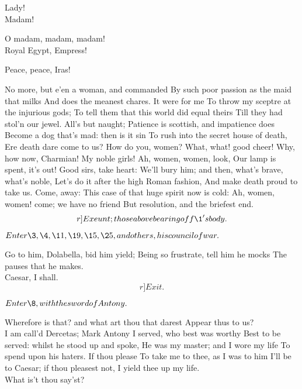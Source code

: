 \documentclass{book}
\begin{document}
\7	Lady! \\

	Madam!

\7	O madam, madam, madam! \\

	Royal Egypt,
        Empress!

\7	Peace, peace, Iras!

\2	No more, but e'en a woman, and commanded
	By such poor passion as the maid that milks
	And does the meanest chares. It were for me
	To throw my sceptre at the injurious gods;
	To tell them that this world did equal theirs
	Till they had stol'n our jewel. All's but naught;
	Patience is scottish, and impatience does
	Become a dog that's mad: then is it sin
	To rush into the secret house of death,
	Ere death dare come to us? How do you, women?
	What, what! good cheer! Why, how now, Charmian!
	My noble girls! Ah, women, women, look,
	Our lamp is spent, it's out! Good sirs, take heart:
	We'll bury him; and then, what's brave, what's noble,
	Let's do it after the high Roman fashion,
	And make death proud to take us. Come, away:
	This case of that huge spirit now is cold:
	Ah, women, women! come; we have no friend
	But resolution, and the briefest end.
	\[r]Exeunt; those above bearing off \1's body.\]

\Act





	\(Enter \3, \4, \11, \19, \15,\\ \25, and others, his council of war.\)

\3	Go to him, Dolabella, bid him yield;
	Being so frustrate, tell him he mocks
	The pauses that he makes. \\

	Caesar, I shall.  \[r]Exit.\]

	\(Enter \8, with the sword of Antony.\)

\3	Wherefore is that? and what art thou that darest
	Appear thus to us? \\

\8	                  I am call'd Dercetas;
	Mark Antony I served, who best was worthy
	Best to be served: whilst he stood up and spoke,
	He was my master; and I wore my life
	To spend upon his haters. If thou please
	To take me to thee, as I was to him
	I'll be to Caesar; if thou pleasest not,
	I yield thee up my life. \\

\3	What is't thou say'st?
\end{document}
